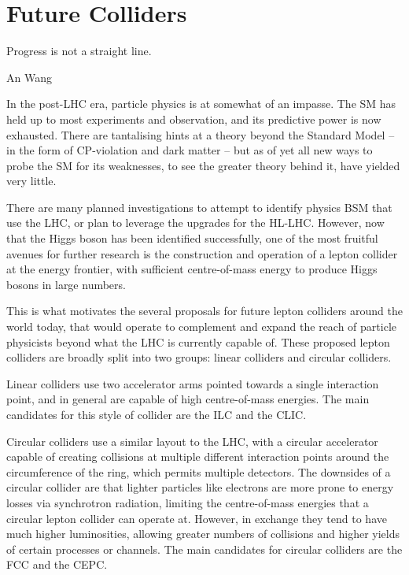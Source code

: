 \chapter{Future Colliders}
\label{chapter:colliders}

\epigraph{Progress is not a straight line.}{An Wang}

In the post-LHC era, particle physics is at somewhat of an impasse. The \acrfull{SM} has held up to most experiments and observation, and its predictive power is now exhausted. There are tantalising hints at a theory beyond the Standard Model -- in the form of CP-violation and dark matter -- but as of yet all new ways to probe the \acrshort{SM} for its weaknesses, to see the greater theory behind it, have yielded very little. 

There are many planned investigations to attempt to identify physics \acrlong{BSM} that use the \acrfull{LHC}, or plan to leverage the upgrades for the \acrfull{HL-LHC}. However, now that the Higgs boson has been identified successfully, one of the most fruitful avenues for further research is the construction and operation of a lepton collider at the energy frontier, with sufficient centre-of-mass energy to produce Higgs bosons in large numbers.

This is what motivates the several proposals for future lepton colliders around the world today, that would operate to complement and expand the reach of particle physicists beyond what the \acrshort{LHC} is currently capable of. These proposed lepton colliders are broadly split into two groups: linear colliders and circular colliders. 

Linear colliders use two accelerator arms pointed towards a single interaction point, and in general are capable of high centre-of-mass energies. The main candidates for this style of collider are the \acrfull{ILC} and the \acrfull{CLIC}. 

Circular colliders use a similar layout to the \acrshort{LHC}, with a circular accelerator capable of creating collisions at multiple different interaction points around the circumference of the ring, which permits multiple detectors. The downsides of a circular collider are that lighter particles like electrons are more prone to energy losses via synchrotron radiation, limiting the centre-of-mass energies that a circular lepton collider can operate at. However, in exchange they tend to have much higher luminosities, allowing greater numbers of collisions and higher yields of certain processes or channels. The main candidates for circular colliders are the \acrfull{FCC} and the \acrfull{CEPC}. 

